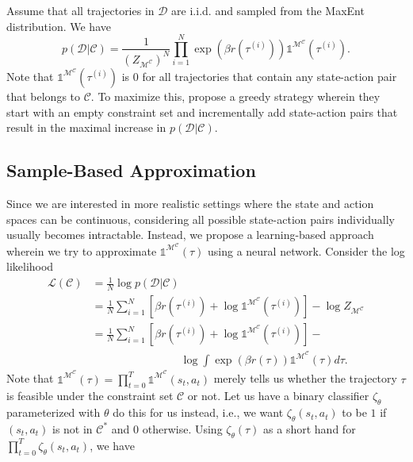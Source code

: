 \documentclass{article}
\begin{document}
Assume that all trajectories in $\mathcal{D}$ are i.i.d. and sampled from the MaxEnt distribution. We have
\begin{equation}
    p(\mathcal{D} \vert \mathcal{C}) = \frac{1}{\left(Z_{\mathcal{M}^\mathcal{C}}\right)^N}\prod_{i=1}^{N}\exp(\beta r(\tau^{(i)}))\mathds{1}^{\mathcal{M}^\mathcal{C}}(\tau^{(i)}).
    \label{eq:p_d_given_c}
\end{equation}
Note that $\mathds{1}^{\mathcal{M}^\mathcal{C}}(\tau^{(i)})$ is $0$ for all trajectories that contain any state-action pair that belongs to $\mathcal{C}$. To maximize this, \citeauthor{scobee2020maximum} propose a greedy strategy wherein they start with an empty constraint set and incrementally add state-action pairs that result in the maximal increase in $p(\mathcal{D}\vert\mathcal{C})$.

\subsection{Sample-Based Approximation}
Since we are interested in more realistic settings where the state and action spaces can be continuous, considering all possible state-action pairs individually usually becomes intractable. Instead, we propose a learning-based approach wherein we try to approximate $\mathds{1}^{\mathcal{M}^\mathcal{C}}(\tau)$ using a neural network. Consider the log likelihood
\begin{equation}
    \begin{split}
        \mathcal{L(C)}
        &= \frac{1}{N}\log p(\mathcal{D}\vert\mathcal{C})\\
        &= \frac{1}{N}\sum_{i=1}^N\left[\beta r(\tau^{(i)}) + \log \mathds{1}^{\mathcal{M}^\mathcal{C}}(\tau^{(i)})\right] - \log Z_{\mathcal{M}^\mathcal{C}}\\
        &= \frac{1}{N}\sum_{i=1}^N\left[\beta r(\tau^{(i)}) + \log \mathds{1}^{\mathcal{M}^\mathcal{C}}(\tau^{(i)})\right] - \\&\qquad\qquad\qquad\qquad\log\int\exp(\beta r(\tau))\mathds{1}^{\mathcal{M}^\mathcal{C}}(\tau)d\tau.
    \end{split}
\end{equation}
Note that $\mathds{1}^{\mathcal{M}^\mathcal{C}}(\tau) = \prod_{t=0}^T \mathds{1}^{\mathcal{M}^\mathcal{C}}(s_t, a_t)$ merely tells us whether the trajectory $\tau$ is feasible under the constraint set $\mathcal{C}$ or not. Let us have a binary classifier $\zeta_\theta$ parameterized with $\theta$ do this for us instead, i.e., we want $\zeta_\theta(s_t,a_t)$ to be $1$ if $(s_t, a_t)$ is not in $\mathcal{C}^*$ and $0$ otherwise. Using $\zeta_\theta(\tau)$ as a short hand for $\prod_{t=0}^T \zeta_\theta(s_t, a_t)$, we have 
\end{document}
